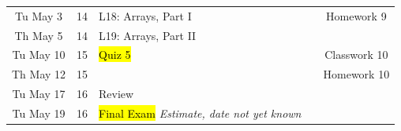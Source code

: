 \documentclass[letter,11pt]{article}
\begin{document}
\begin{tabular}{c c l l c}
Tu May 3 & 14 & L18: Arrays, Part I & & Homework 9 \\
Th May 5 & 14 & L19: Arrays, Part II  &  &  \\
Tu May 10 & 15 & \hl{Quiz 5} & & Classwork 10 \\
Th May 12 & 15 &  &  & Homework 10 \\
Tu May 17 & 16 & Review & \\
Tu May 19 & 16 & \hl{Final Exam} \textit{Estimate, date not yet known} & \\
\end{tabular}



\end{document}
